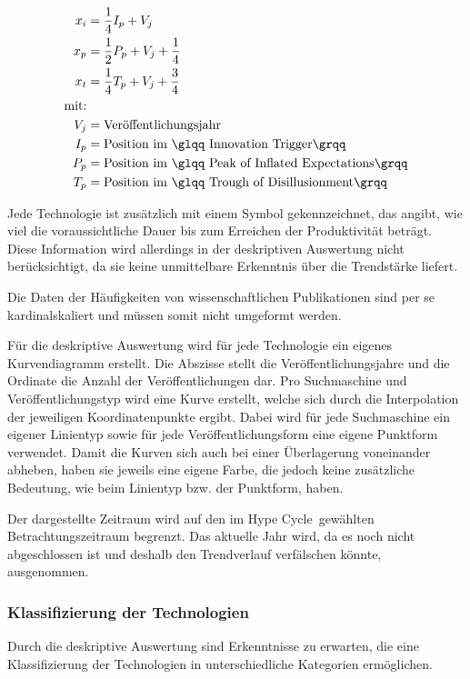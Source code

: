 \begin{align}
x_i &= \frac{1}{4}I_p+V_j \label{eq:pos_i}\\
x_p &= \frac{1}{2}P_p+V_j+\frac{1}{4} \label{eq:pos_p}\\
x_t &= \frac{1}{4}T_p+V_j+\frac{3}{4} \label{eq:pos_t}\\
\text{mit:}\nonumber\\
V_j &= \text{Veröffentlichungsjahr}\nonumber\\
I_p &= \text{Position im \glqq Innovation Trigger\grqq}\nonumber\\
P_p &= \text{Position im \glqq Peak of Inflated Expectations\grqq}\nonumber\\
T_p &= \text{Position im \glqq Trough of Disillusionment\grqq}\nonumber
\end{align}

Jede Technologie ist zusätzlich mit einem Symbol gekennzeichnet, das angibt, wie viel die voraussichtliche Dauer bis zum Erreichen der Produktivität beträgt. Diese Information wird allerdings in der deskriptiven Auswertung nicht berücksichtigt, da sie keine unmittelbare Erkenntnis über die Trendstärke liefert.

Die Daten der Häufigkeiten von wissenschaftlichen Publikationen sind per se kardinalskaliert und müssen somit nicht umgeformt werden.

Für die deskriptive Auswertung wird für jede Technologie ein eigenes Kurvendiagramm erstellt. Die Abszisse stellt die Veröffentlichungsjahre und die Ordinate die Anzahl der Veröffentlichungen dar. Pro Suchmaschine und Veröffentlichungstyp wird eine Kurve erstellt, welche sich durch die Interpolation der jeweiligen Koordinatenpunkte ergibt. Dabei wird für jede Suchmaschine ein eigener Linientyp sowie für jede Veröffentlichungsform eine eigene Punktform verwendet. Damit die Kurven sich auch bei einer Überlagerung voneinander abheben, haben sie jeweils eine eigene Farbe, die jedoch keine zusätzliche Bedeutung, wie beim Linientyp bzw. der Punktform, haben.

Der dargestellte Zeitraum wird auf den im \glqq Hype Cycle\grqq~gewählten Betrachtungszeitraum begrenzt. Das aktuelle Jahr wird, da es noch nicht abgeschlossen ist und deshalb den Trendverlauf verfälschen könnte, ausgenommen.

\subsubsection{Klassifizierung der Technologien}
Durch die deskriptive Auswertung sind Erkenntnisse zu erwarten, die eine Klassifizierung der Technologien in unterschiedliche Kategorien ermöglichen.

